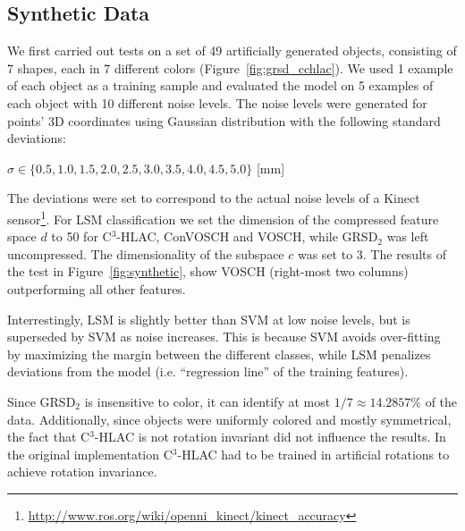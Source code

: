 \documentclass[a4paper, 10 pt, conference]{sty/ieeeconf}
\begin{document}
\subsection{Synthetic Data}
We first carried out tests on a set of 49 artificially generated objects, consisting of
7 shapes, each in 7 different colors (Figure~\ref{fig:grsd_cchlac}). We used 1 example of 
each object as a training sample and evaluated the model on 5 examples of each object with 
10 different noise levels. The noise levels were generated for points' 3D coordinates 
using Gaussian distribution with the following standard deviations:
\begin{center}
$\sigma \in \{0.5, 1.0, 1.5, 2.0, 2.5, 3.0, 3.5, 4.0, 4.5, 5.0\}$ [mm]
\end{center}
The deviations were set to correspond to the actual noise levels of a Kinect 
sensor\footnote{\url{http://www.ros.org/wiki/openni_kinect/kinect_accuracy}}.
For LSM classification we set the dimension of the compressed feature space $d$ to 
50 for C$^3$-HLAC, ConVOSCH and VOSCH, while GRSD$_2$ was left uncompressed. 
The dimensionality of the subspace $c$ was set to 3.
The results of the test in Figure~\ref{fig:synthetic},
show VOSCH (right-most two columns) outperforming all other features.

Interrestingly, LSM is slightly better than SVM at low noise levels, but is superseded
by SVM as noise increases. This is because SVM avoids over-fitting by maximizing the margin
between the different classes, while LSM penalizes deviations from the model
(i.e. ``regression line'' of the training features).


Since GRSD$_2$ is insensitive to color, it can identify at most $1/7 \approx 14.2857\%$ of the data.
Additionally, since objects were uniformly colored and mostly symmetrical, the fact that C$^3$-HLAC 
is not rotation invariant did not influence the results. In the original implementation C$^3$-HLAC 
had to be trained in artificial rotations to achieve rotation invariance.
\end{document}
